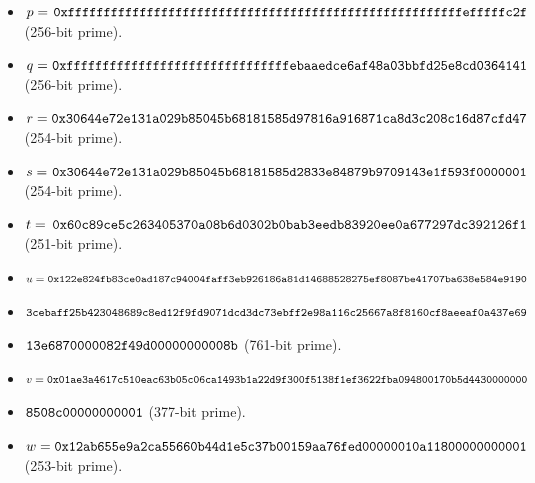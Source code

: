 \begin{itemize}
	\item[$\bullet$] $p = \tt{\hspace{0.04cm}0xfffffffffffffffffffffffffffffffffffffffffffffffffffffffefffffc2f}$ (256-bit prime).
	\item[$\bullet$] $q = \tt{\hspace{0.01cm}0xfffffffffffffffffffffffffffffffebaaedce6af48a03bbfd25e8cd0364141}$ (256-bit prime).	
	\item[$\bullet$] $r = \tt{0x30644e72e131a029b85045b68181585d97816a916871ca8d3c208c16d87cfd47}$ (254-bit prime).
	\item[$\bullet$] $s = \tt{\hspace{0.03cm}0x30644e72e131a029b85045b68181585d2833e84879b9709143e1f593f0000001}$ (254-bit prime).
	\item[$\bullet$] $t = \tt{\hspace{0.07cm}0x60c89ce5c263405370a08b6d0302b0bab3eedb83920ee0a677297dc392126f1}$ (251-bit prime).
	\item[$\bullet$] $u = \tt{0x122e824fb83ce0ad187c94004faff3eb926186a81d14688528275ef8087be41707ba638e584e9190}$
	\item[] \hspace{0.53cm} $\tt{3cebaff25b423048689c8ed12f9fd9071dcd3dc73ebff2e98a116c25667a8f8160cf8aeeaf0a437e69}$
	\item[] \hspace{0.53cm} $\tt{13e6870000082f49d00000000008b}$ (761-bit prime).
	\item[$\bullet$] $v = \tt{0x01ae3a4617c510eac63b05c06ca1493b1a22d9f300f5138f1ef3622fba094800170b5d4430000000}$
	\item[] \hspace{0.52cm} $\tt{8508c00000000001}$ (377-bit prime).
	\item[$\bullet$] $w = \tt{0x12ab655e9a2ca55660b44d1e5c37b00159aa76fed00000010a11800000000001}$ (253-bit prime).
\end{itemize}

